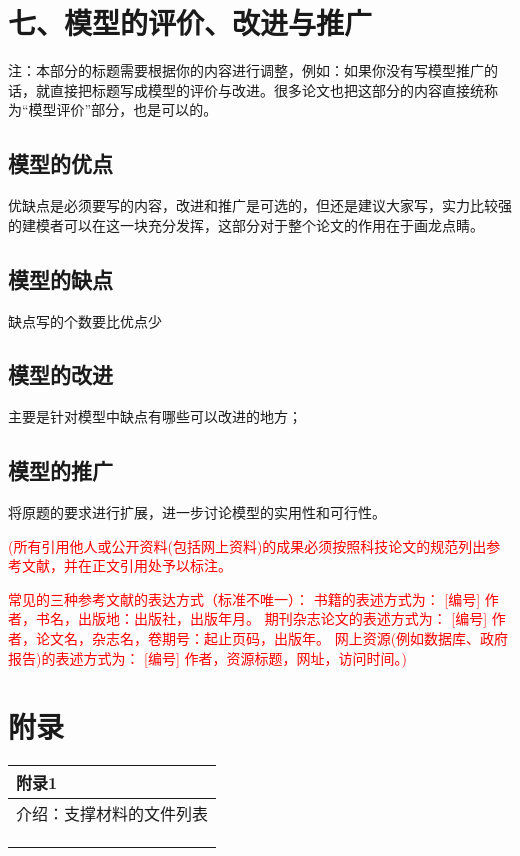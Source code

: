 \documentclass{article}
\begin{document}
\section{七、模型的评价、改进与推广}
注：本部分的标题需要根据你的内容进行调整，例如：如果你没有写模型推广的话，就直接把标题写成模型的评价与改进。很多论文也把这部分的内容直接统称为“模型评价”部分，也是可以的。

\subsection{模型的优点}
优缺点是必须要写的内容，改进和推广是可选的，但还是建议大家写，实力比较强的建模者可以在这一块充分发挥，这部分对于整个论文的作用在于画龙点睛。
\subsection{模型的缺点}
缺点写的个数要比优点少
\subsection{模型的改进}
主要是针对模型中缺点有哪些可以改进的地方\cite{risken1996fokker}；
\subsection{模型的推广}
将原题的要求进行扩展\cite{rossler1979equation}，进一步讨论模型的实用性和可行性\cite{mckean1970nagumo}。

\begin{center}
\end{center}
\textcolor{red}{(所有引用他人或公开资料(包括网上资料)的成果必须按照科技论文的规范列出参考文献，并在正文引用处予以标注。}

\textcolor{red}{常见的三种参考文献的表达方式（标准不唯一）：
书籍的表述方式为： [编号] 作者，书名，出版地：出版社，出版年月。
期刊杂志论文的表述方式为： [编号] 作者，论文名，杂志名，卷期号：起止页码，出版年。
网上资源(例如数据库、政府报告)的表述方式为： [编号] 作者，资源标题，网址，访问时间。)}
\newpage
\section{附录}

\begin{table}[htbp]
    \centering
    \begin{tabular}{|p{14.0cm}|}
    \hline
    \textbf{附录1} \\ %
    \hline
    介绍：支撑材料的文件列表  \\ 
    \\
    \\
    \\
    \hline
    \end{tabular}
\end{table}
\end{document}
